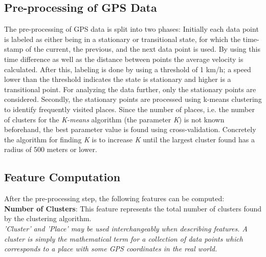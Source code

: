 \subsection{Pre-processing of GPS Data}
The pre-processing of GPS data is split into two phases: Initially each data point is labeled as either being in a stationary or transitional state, for which the time-stamp of the current, the previous, and the next data point is used. By using this time difference as well as the distance between points the average velocity is calculated. After this, labeling is done by using a threshold of 1 km/h; a speed lower than the threshold indicates the state is stationary and higher is a transitional point. For analyzing the data further, only the stationary points are considered. Secondly, the stationary points are processed using k-means clustering to identify frequently visited places. Since the number of places, i.e. the number of clusters for the \textit{K-means} algorithm (the parameter \textit{K}) is not known beforehand, the best parameter value is found using cross-validation. Concretely the algorithm for finding \textit{K} is to increase \textit{K} until the largest cluster found has a radius of 500 meters or lower.

\subsection{Feature Computation}
\label{ref:features-saeb2015}
After the pre-processing step, the following features can be computed:\\

\textbf{Number of Clusters}: This feature represents the total number of clusters found by the clustering algorithm.\\
\textit{'Cluster' and 'Place' may be used interchangeably when describing features. A cluster is simply the mathematical term for a collection of data points which corresponds to a place with some GPS coordinates in the real world.}\\


